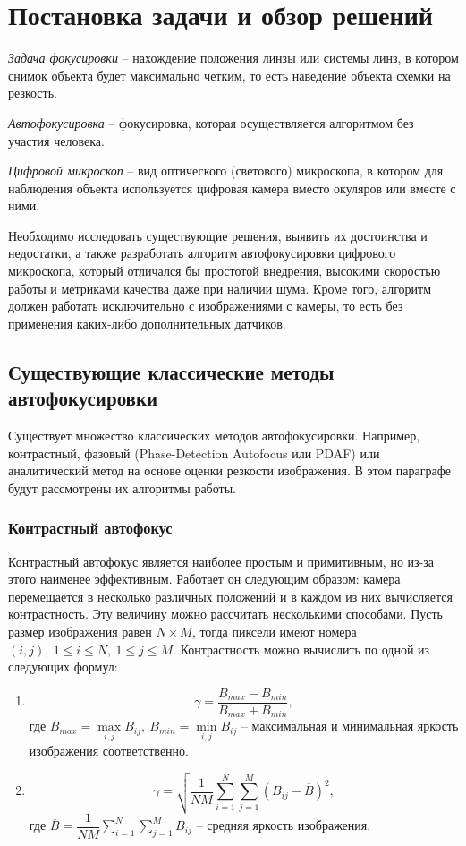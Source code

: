 \chapter{Постановка задачи и обзор решений} \label{ch1}
\textit{Задача фокусировки} -- нахождение положения линзы или системы линз, в котором снимок объекта будет максимально четким, то есть наведение объекта схемки на резкость.

\textit{Автофокусировка} -- фокусировка, которая осуществляется алгоритмом без участия человека.

\textit{Цифровой микроскоп} -- вид оптического (светового) микроскопа, в котором для наблюдения объекта используется цифровая камера вместо окуляров или вместе с ними.

Необходимо исследовать существующие решения, выявить их достоинства и недостатки, а также разработать алгоритм автофокусировки цифрового микроскопа, который отличался бы простотой внедрения, высокими скоростью работы и метриками качества даже при наличии шума. Кроме того, алгоритм должен работать исключительно с изображениями с камеры, то есть без применения каких-либо дополнительных датчиков.

\section{Существующие классические методы автофокусировки} \label{ch1:sec1}
Существует множество классических методов автофокусировки. Например, контрастный, фазовый (Phase-Detection Autofocus или PDAF) или аналитический метод на основе оценки резкости изображения. В этом параграфе будут рассмотрены их алгоритмы работы.

\subsection{Контрастный автофокус}
Контрастный автофокус является наиболее простым и примитивным, но из-за этого наименее эффективным. Работает он следующим образом: камера перемещается в несколько различных положений и в каждом из них вычисляется контрастность. Эту величину можно рассчитать несколькими способами. Пусть размер изображения равен $N \times M$, тогда пиксели имеют номера $(i,j),\ 1 \leq i \leq N,\ 1 \leq j \leq M$. Контрастность можно вычислить по одной из следующих формул:

\begin{enumerate}[1.]
	\item \begin{equation}
		\gamma = \dfrac{B_{max} - B_{min}}{B_{max} + B_{min}},
	\end{equation}
	где $B_{max} = \max\limits_{i,j} B_{ij},\ B_{min} = \min\limits_{i,j} B_{ij}$ -- максимальная и минимальная яркость изображения соответственно.
	
	\item \begin{equation}
		\gamma = \sqrt{\dfrac{1}{NM} \sum\limits_{i=1}^{N} \sum\limits_{j=1}^{M} (B_{ij} - \overline{B})^2},
	\end{equation}
	где $\overline{B} = \dfrac{1}{NM} \sum\limits_{i=1}^{N} \sum\limits_{j=1}^{M} B_{ij}$ -- средняя яркость изображения.
\end{enumerate}


